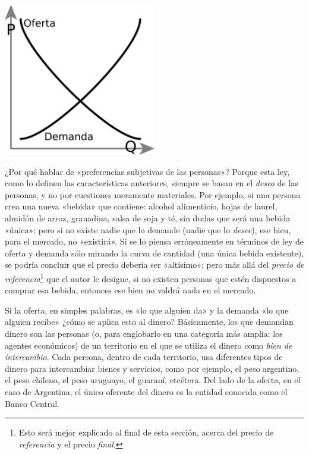 \documentclass[12pt,a4paper,twoside]{book}
\begin{document}
\begin{center}
\includegraphics[width=0.5\textwidth]{img/leyofertademanda.png}
\end{center}

¿Por qué hablar de «preferencias subjetivas de las personas»? Porque esta ley, como lo definen las características anteriores, siempre se basan en el \textit{deseo} de las personas, y no por cuestiones meramente materiales. Por ejemplo, si una persona crea una nueva «bebida» que contiene: alcohol alimenticio, hojas de laurel, almidón de arroz, granadina, salsa de soja y té, sin dudas que será una bebida «única»; pero si no existe nadie que lo demande (nadie que lo \textit{desee}), ese bien, para el mercado, no «existirá». Si se lo piensa erróneamente en términos de ley de oferta y demanda sólo mirando la curva de cantidad (una única bebida existente), se podría concluir que el precio debería ser «altísimo»; pero más allá del \textit{precio de referencia}\footnote{Esto será mejor explicado al final de esta sección, acerca del precio de \textit{referencia} y el precio \textit{final}.} que el autor le designe, si no existen personas que estén dispuestos a comprar esa bebida, entonces ese bien no valdrá nada en el mercado.

Si la oferta, en simples palabras, es «lo que alguien da» y la demanda «lo que alguien recibe» ¿cómo se aplica esto al dinero? Básicamente, los que demandan
dinero son las personas (o, para englobarlo en una categoría más amplia: los agentes económicos) de un territorio en el que se utiliza el dinero como \textit{bien de intercambio}. Cada persona, dentro de cada territorio, usa diferentes tipos de dinero para intercambiar bienes y servicios, como por ejemplo, el peso argentino, el peso chileno, el peso uruguayo, el guaraní, etcétera. Del lado de la oferta, en el caso de Argentina, el único oferente del dinero es la entidad conocida como el Banco Central.
\end{document}
